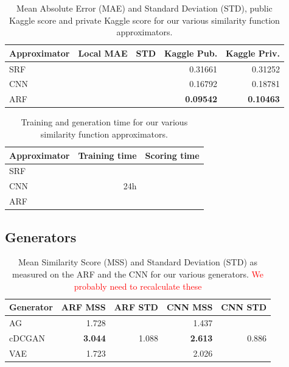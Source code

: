 \documentclass[10pt,conference,compsocconf]{IEEEtran}
\newcommand\TODO[1]{\textcolor{red}{#1}} %
\begin{document}
\begin{table}[htbp]
  \centering
  \begin{tabular}[c]{|l||r|r||r|r|}
    \hline
    Approximator    & Local MAE & STD   & Kaggle Pub.       & Kaggle Priv.\\ %
    \hline
    SRF             &           &       & 0.31661           & 0.31252\\ %
    CNN             &           &       & 0.16792           & 0.18781\\ %
    ARF             &           &       & \textbf{0.09542}  & \textbf{0.10463}\\ %
    \hline
  \end{tabular}
  \caption{Mean Absolute Error (MAE) and Standard Deviation (STD), public Kaggle score and private Kaggle score for our various similarity function approximators.}
  \label{tab:SFA_MSS}
\end{table}

\begin{table}[htbp]
  \centering
  \begin{tabular}[c]{|l||r|r|}
    \hline
    Approximator    & Training time     & Scoring time \\
    \hline
    SRF             &                   &       \\
    CNN             & 24h               &       \\
    ARF             &                   &       \\
    \hline
  \end{tabular}
  \caption{Training and generation time for our various similarity function approximators.}
  \label{tab:SFA_time}
\end{table}


\subsection{Generators}
\begin{table}[htbp]
  \centering
  \begin{tabular}[c]{|l||r|r||r|r|}
    \hline
    Generator   & ARF MSS       & ARF STD   & CNN MSS       & CNN STD \\
    \hline
    AG          & 1.728         &           & 1.437         &  \\
    cDCGAN      & \textbf{3.044}& 1.088     & \textbf{2.613}& 0.886 \\
    VAE         & 1.723         &           & 2.026         &  \\
    \hline
  \end{tabular}
  \caption{Mean Similarity Score (MSS) and Standard Deviation (STD) as measured on the ARF and the CNN for our various generators. \TODO{We probably need to recalculate these}}
  \label{tab:gen_MSS}
\end{table}
\end{document}
